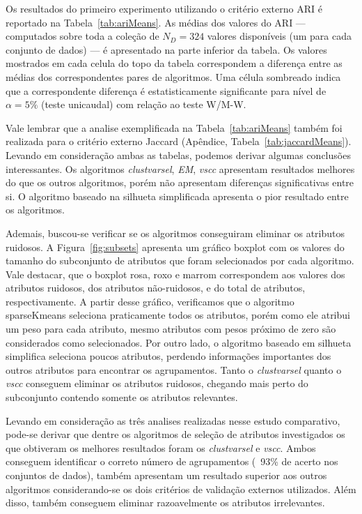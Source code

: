 \documentclass{acm_proc_article-sp}
\begin{document}
Os resultados do primeiro experimento utilizando o critério externo ARI é reportado na Tabela~\ref{tab:ariMeans}.
As médias dos valores do ARI --- computados sobre toda a coleção de $N_{D}=324$ valores disponíveis (um para cada conjunto de dados) --- é apresentado na parte inferior da tabela.
Os valores mostrados em cada celula do topo da tabela correspondem a diferença entre as médias dos correspondentes pares de algoritmos.
Uma célula sombreado indica que a correspondente diferença é estatisticamente significante para nível de $\alpha=5\%$ (teste unicaudal) com relação ao teste W/M-W.

Vale lembrar que a analise exemplificada na Tabela~\ref{tab:ariMeans} também foi realizada para o critério externo Jaccard (Apêndice, Tabela~\ref{tab:jaccardMeans}).
Levando em consideração ambas as tabelas, podemos derivar algumas conclusões interessantes.
Os algoritmos \textit{clustvarsel}, \textit{EM}, \textit{vscc} apresentam resultados melhores do que os outros algoritmos, porém não apresentam diferenças significativas entre si. 
O algoritmo baseado na silhueta simplificada apresenta o pior resultado entre os algoritmos.

Ademais, buscou-se verificar se os algoritmos conseguiram eliminar os atributos ruidosos.
A Figura~\ref{fig:subsets} apresenta um gráfico boxplot com os valores do tamanho do subconjunto de atributos que foram selecionados por cada algoritmo.
Vale destacar, que o boxplot rosa, roxo e marrom correspondem aos valores dos atributos ruidosos, dos atributos não-ruidosos, e do total de atributos, respectivamente.
A partir desse gráfico, verificamos que o algoritmo sparseKmeans seleciona praticamente todos os atributos, porém como ele atribui um peso para cada atributo, mesmo atributos com pesos próximo de zero são considerados como selecionados.
Por outro lado, o algoritmo baseado em silhueta simplifica seleciona poucos atributos, perdendo informações importantes dos outros atributos para encontrar os agrupamentos.
Tanto o \textit{clustvarsel} quanto o \textit{vscc} conseguem eliminar os atributos ruidosos, chegando mais perto do subconjunto contendo somente os atributos relevantes.

Levando em consideração as três analises realizadas nesse estudo comparativo, pode-se derivar que dentre os algoritmos de seleção de atributos investigados os que obtiveram os melhores resultados foram os \textit{clustvarsel} e \textit{vscc}.
Ambos conseguem identificar o correto número de agrupamentos (~93\% de acerto nos conjuntos de dados), também apresentam um resultado superior aos outros algoritmos considerando-se os dois critérios de validação externos utilizados.
Além disso, também conseguem eliminar razoavelmente os atributos irrelevantes.
\end{document}
